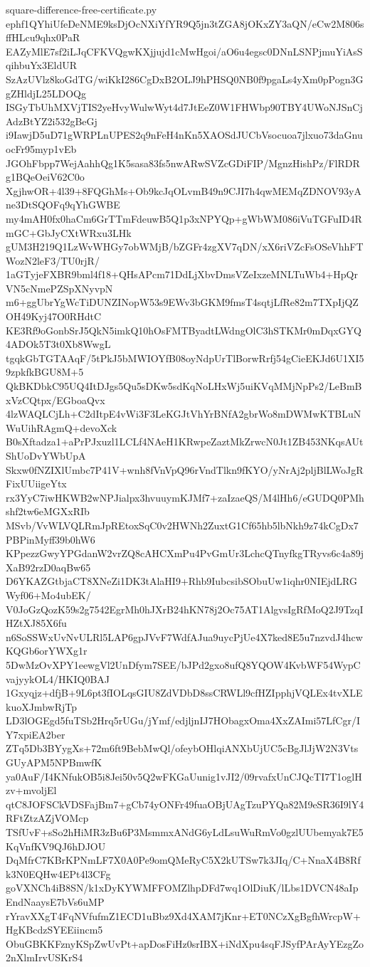 \documentclass[11pt]{article}
\theoremstyle{definition}
\theoremstyle{remark}
\begin{document}
\begin{filecontents*}[overwrite]{square-difference-free-certificate.py}
ephf1QYhiUfeDeNME9ksDjOcNXiYfYR9Q5jn3tZGA8jOKxZY3aQN/eCw2M806sffHLcu9qhx0PaR
EAZyMlE7sf2iLJqCFKVQgwKXjjujd1cMwHgoi/aO6u4egsc0DNnLSNPjmuYiAsSqihbuYx3EldUR
SzAzUVlz8koGdTG/wiKkI286CgDxB2OLJ9hPHSQ0NB0f9pgaLs4yXm0pPogn3GgZHldjL25LDOQg
ISGyTbUhMXVjTIS2yeHvyWulwWyt4d7JtEeZ0W1FHWbp90TBY4UWoNJSnCjAdzBtYZ2i532gBeGj
i9IawjD5uD71gWRPLnUPES2q9nFeH4nKn5XAOSdJUCbVsocuoa7jlxuo73daGnuocFr95myp1vEb
JGOhFbpp7WejAahhQg1K5sasa83fs5nwARwSVZcGDiFIP/MgnzHishPz/FlRDRg1BQeOeiV62C0o
XgjhwOR+4l39+8FQGhMs+Ob9kcJqOLvmB49n9CJI7h4qwMEMqZDNOV93yAne3DtSQOFq9qYhGWBE
my4mAH0fx0haCm6GrTTmFdeuwB5Q1p3xNPYQp+gWbWM086iVuTGFuID4RmGC+GbJyCXtWRxu3LHk
gUM3H219Q1LzWvWHGy7obWMjB/bZGFr4zgXV7qDN/xX6riVZcFsOSeVhhFTWozN2leF3/TU0rjR/
1aGTyjeFXBR9bml4f18+QHsAPcm71DdLjXbvDmsVZeIxzeMNLTuWb4+HpQrVN5cNmePZSpXNyvpN
m6+ggUbrYgWcTiDUNZINopW53s9EWv3bGKM9fmsT4sqtjLfRe82m7TXpIjQZOH49Kyj47O0RHdtC
KE3Rf9oGonbSrJ5QkN5imkQ10hOsFMTByadtLWdngOlC3hSTKMr0mDqxGYQ4ADOk5T3t0Xb8WwgL
tgqkGbTGTAAqF/5tPkJ5bMWIOYfB08oyNdpUrTlBorwRrfj54gCieEKJd6U1XI59zpkfkBGU8M+5
QkBKDbkC95UQ4ItDJgs5Qu5sDKw5sdKqNoLHxWj5uiKVqMMjNpPs2/LeBmBxVzCQtpx/EGboaQvx
4lzWAQLCjLh+C2dItpE4vWi3F3LeKGJtVhYrBNfA2gbrWo8mDWMwKTBLuNWuUihRAgmQ+devoXck
B0sXftadza1+aPrPJxuzl1LCLf4NAeH1KRwpeZaztMkZrwcN0Jt1ZB453NKqsAUtShUoDvYWbUpA
Skxw0fNZIXlUmbc7P41V+wnh8fVnVpQ96rVndTlkn9fKYO/yNrAj2pljBlLWoJgRFixUUiigeYtx
rx3YyC7iwHKWB2wNPJialpx3hvuuymKJMf7+zaIzaeQS/M4lHh6/eGUDQ0PMhshf2tw6eMGXxRIb
MSvb/VvWLVQLRmJpREtoxSqC0v2HWNh2ZuxtG1Cf65hb5lbNkh9z74kCgDx7PBPinMyff39b0hW6
KPpezzGwyYPGdanW2vrZQ8cAHCXmPu4PvGmUr3LchcQTnyfkgTRyvs6c4a89jXaB92rzD0aqBw65
D6YKAZGtbjaCT8XNeZi1DK3tAlaHI9+Rhb9IubcsibSObuUw1iqhr0NIEjdLRGWyf06+Mo4ubEK/
V0JoGzQozK59s2g7542EgrMh0hJXrB24hKN78j2Oc75AT1AlgvsIgRfMoQ2J9TzqIHZtXJ85X6fu
n6SoSSWxUvNvULRl5LAP6gpJVvF7WdfAJua9uycPjUe4X7ked8E5u7nzvdJ4hcwKQGb6orYWXg1r
5DwMzOvXPY1eewgVl2UnDfym7SEE/bJPd2gxo8ufQ8YQOW4KvbWF54WypCvajyykOL4/HKIQ0BAJ
1Gxyqjz+dfjB+9L6pt3fIOLqsGIU8ZdVDbD8ssCRWLl9cfHZIpphjVQLEx4tvXLEkuoXJmbwRjTp
LD3lOGEgd5fuTSb2Hrq5rUGu/jYmf/edjljnIJ7HObagxOma4XxZAImi57LfCgr/IY7xpiEA2ber
ZTq5Db3BYygXs+72m6ft9BebMwQl/ofeybOHlqiANXbUjUC5cBgJlJjW2N3VtsGUyAPM5NPBmwfK
ya0AuF/I4KNfukOB5i8Jei50v5Q2wFKGaUunig1vJI2/09rvafxUnCJQcTI7T1oglHzv+mvoljEl
qtC8JOFSCkVDSFajBm7+gCb74yONFr49fuaOBjUAgTzuPYQa82M9eSR36I9lY4RFtZtzAZjVOMcp
TSfUvF+sSo2hHiMR3zBu6P3MsmmxANdG6yLdLsuWuRmVo0gzlUUbemyak7E5KqVnfKV9QJ6hDJOU
DqMfrC7KBrKPNmLF7X0A0Pe9omQMeRyC5X2kUTSw7k3JIq/C+NnaX4B8Rfk3N0EQHw4EPt4l3CFg
goVXNCh4iB8SN/k1xDyKYWMFFOMZlhpDFd7wq1OlDiuK/lLbs1DVCN48aIpEndNaaysE7bVs6uMP
rYravXXgT4FqNVfufmZ1ECD1uBbz9Xd4XAM7jKnr+ET0NCzXgBgfhWrcpW+HgKBcdzSYEEiincm5
ObuGBKKFznyKSpZwUvPt+apDosFiHz0srIBX+iNdXpu4sqFJSyfPArAyYEzgZo2nXlmIrvUSKrS4

\end{filecontents*}
\end{document}
